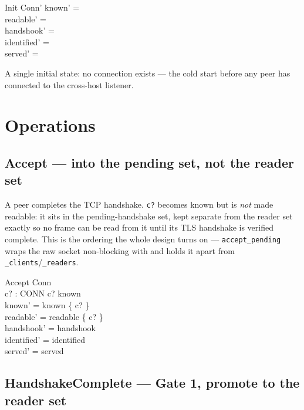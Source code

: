 \documentclass[a4paper,10pt,fleqn]{article}
\begin{document}
\begin{schema}{Init}
  Conn'
\where
  known' = \emptyset \\
  readable' = \emptyset \\
  handshook' = \emptyset \\
  identified' = \emptyset \\
  served' = \emptyset
\end{schema}

A single initial state: no connection exists --- the cold start before any
peer has connected to the cross-host listener.

\section{Operations}

\subsection{Accept --- into the pending set, not the reader set}

A peer completes the TCP handshake.  \texttt{c?} becomes known but is
\emph{not} made readable: it sits in the pending-handshake set, kept
separate from the reader set exactly so no frame can be read from it until
its TLS handshake is verified complete.  This is the ordering the whole
design turns on --- \texttt{accept\_pending} wraps the raw socket
non-blocking with  and holds it
apart from \texttt{\_clients}/\texttt{\_readers}.

\begin{schema}{Accept}
  \Delta Conn \\
  c? : CONN
\where
  c? \notin known \\
  known' = known \cup \{ c? \} \\
  readable' = readable \cup \{ c? \} \\
  handshook' = handshook \\
  identified' = identified \\
  served' = served
\end{schema}

\subsection{HandshakeComplete --- Gate 1, promote to the reader set}
\end{document}
